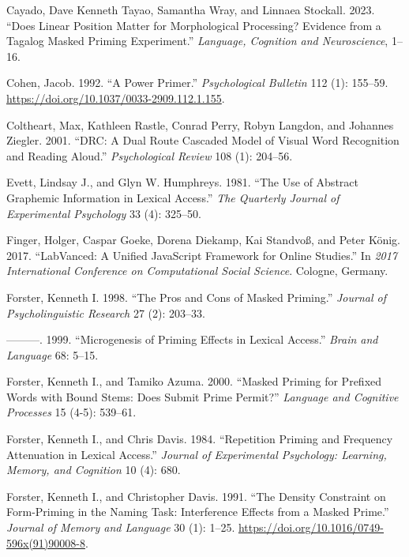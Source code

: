 \documentclass[
]{interact}
\newlength{\cslhangindent}
\newenvironment{CSLReferences}[2] %
 {\begin{list}{}{%
  \setlength{\itemindent}{0pt}
  \setlength{\leftmargin}{0pt}
  \setlength{\parsep}{0pt}
  \ifodd #1
   \setlength{\leftmargin}{\cslhangindent}
   \setlength{\itemindent}{-1\cslhangindent}
  \fi
  \setlength{\itemsep}{#2\baselineskip}}}
 {\end{list}}
\begin{document}
\begin{CSLReferences}{1}{0}
Cayado, Dave Kenneth Tayao, Samantha Wray, and Linnaea Stockall. 2023.
{``Does Linear Position Matter for Morphological Processing? Evidence
from a Tagalog Masked Priming Experiment.''} \emph{Language, Cognition
and Neuroscience}, 1--16.

Cohen, Jacob. 1992. {``A Power Primer.''} \emph{Psychological Bulletin}
112 (1): 155--59. \url{https://doi.org/10.1037/0033-2909.112.1.155}.

Coltheart, Max, Kathleen Rastle, Conrad Perry, Robyn Langdon, and
Johannes Ziegler. 2001. {``DRC: A Dual Route Cascaded Model of Visual
Word Recognition and Reading Aloud.''} \emph{Psychological Review} 108
(1): 204--56.

Evett, Lindsay J., and Glyn W. Humphreys. 1981. {``The Use of Abstract
Graphemic Information in Lexical Access.''} \emph{The Quarterly Journal
of Experimental Psychology} 33 (4): 325--50.

Finger, Holger, Caspar Goeke, Dorena Diekamp, Kai Standvoß, and Peter
König. 2017. {``LabVanced: A Unified JavaScript Framework for Online
Studies.''} In \emph{2017 International Conference on Computational
Social Science}. Cologne, Germany.

Forster, Kenneth I. 1998. {``The Pros and Cons of Masked Priming.''}
\emph{Journal of Psycholinguistic Research} 27 (2): 203--33.

---------. 1999. {``Microgenesis of Priming Effects in Lexical
Access.''} \emph{Brain and Language} 68: 5--15.

Forster, Kenneth I., and Tamiko Azuma. 2000. {``Masked Priming for
Prefixed Words with Bound Stems: Does Submit Prime Permit?''}
\emph{Language and Cognitive Processes} 15 (4-5): 539--61.

Forster, Kenneth I., and Chris Davis. 1984. {``Repetition Priming and
Frequency Attenuation in Lexical Access.''} \emph{Journal of
Experimental Psychology: Learning, Memory, and Cognition} 10 (4): 680.

Forster, Kenneth I., and Christopher Davis. 1991. {``The Density
Constraint on Form-Priming in the Naming Task: Interference Effects from
a Masked Prime.''} \emph{Journal of Memory and Language} 30 (1): 1--25.
\url{https://doi.org/10.1016/0749-596x(91)90008-8}.


\end{CSLReferences}
\end{document}
